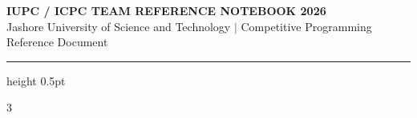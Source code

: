 \documentclass[a4paper,10pt,landscape]{article}
\begin{document}
\thispagestyle{fancy}
\begin{center}
  {\LARGE\sffamily\bfseries IUPC / ICPC TEAM REFERENCE NOTEBOOK 2026}\\[2pt]
  {\small\sffamily Jashore University of Science and Technology \quad $\vert$ \quad Competitive Programming Reference Document}
\end{center}
\vspace{-4pt}
\hrule height 0.5pt
\vspace{4pt}

\begin{multicols*}{3}
\setlength{\columnsep}{6pt}
\setlength{\columnseprule}{0.2pt}
\tableofcontents
\end{multicols*}

\newpage
\end{document}
